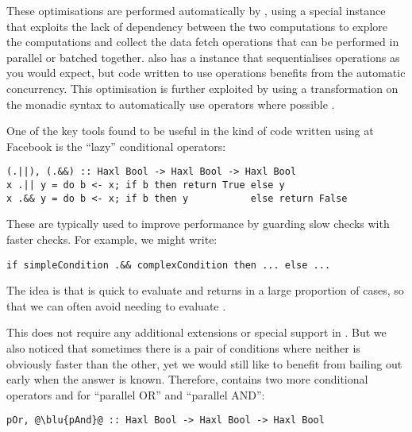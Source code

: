 These optimisations are performed automatically by \Haxl, using a
special  instance that exploits the lack of
dependency between the two computations to explore the computations
and collect the data fetch operations that can be performed in
parallel or batched together. \Haxl also has a  instance
that sequentialises operations as you would expect, but code written
to use  operations benefits from the automatic
concurrency. This optimisation is further exploited by using a
transformation on the monadic  syntax to automatically use
 operators where possible \cite{marlow2016applicativedo}.

One of the key tools found to be useful in the kind of code written
using \Haxl at Facebook is the ``lazy'' conditional operators:

\vspace{1mm}
\begin{verbatim}
(.||), (.&&) :: Haxl Bool -> Haxl Bool -> Haxl Bool
x .|| y = do b <- x; if b then return True else y
x .&& y = do b <- x; if b then y           else return False
\end{verbatim}
\vspace{1mm}

These are typically used to improve performance by guarding slow
checks with faster checks.  For example, we might write:

\vspace{1mm}
\begin{verbatim}
if simpleCondition .&& complexCondition then ... else ...
\end{verbatim}
\vspace{1mm}

\noindent
The idea is that  is quick to evaluate and
returns  in a large proportion of cases, so that we can
often avoid needing to evaluate .

This does not require any additional extensions or special support in
\Haxl. But we also noticed that sometimes there is a pair of conditions
where neither is obviously faster than the other, yet we would still
like to benefit from bailing out early when the answer is known.
Therefore, \Haxl contains two more conditional operators  and
 for ``parallel OR'' and ``parallel AND'':

\vspace{1mm}
\begin{verbatim}
pOr, @\blu{pAnd}@ :: Haxl Bool -> Haxl Bool -> Haxl Bool
\end{verbatim}
\vspace{1mm}


